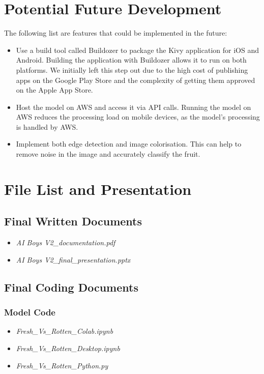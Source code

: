 \documentclass[conference]{IEEEtran}
\begin{document}
\section{Potential Future Development}

The following list are features that could be implemented in the future:
\begin{itemize}
    \item Use a build tool called Buildozer to package the Kivy application for iOS and Android. Building the application with Buildozer allows it to run on both platforms. We initially left this step out due to the high cost of publishing apps on the Google Play Store and the complexity of getting them approved on the Apple App Store. %
    \item Host the model on AWS and access it via API calls. Running the model on AWS reduces the processing load on mobile devices, as the model's processing is handled by AWS.
    \item Implement both edge detection and image colorisation. This can help to remove noise in the image and accurately classify the fruit.
\end{itemize}

\section{File List and Presentation}

\subsection{Final Written Documents}
\begin{itemize}
    \item \textit{AI Boys V2\_documentation.pdf}
    \item \textit{AI Boys V2\_final\_presentation.pptx}
\end{itemize}

\subsection{Final Coding Documents}

\subsubsection{Model Code}
\begin{itemize}
    \item \textit{Fresh\_Vs\_Rotten\_Colab.ipynb}
    \item \textit{Fresh\_Vs\_Rotten\_Desktop.ipynb}
    \item \textit{Fresh\_Vs\_Rotten\_Python.py}
\end{itemize}
\end{document}

